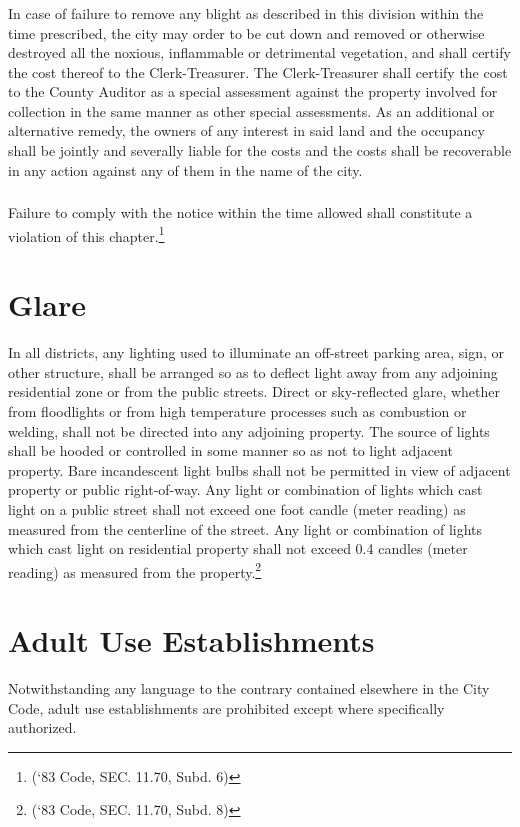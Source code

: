 \subsubsection{}
In case of failure to remove any blight as described in this division within the time prescribed, the city may order to be cut down and removed or otherwise destroyed all the noxious, inflammable or detrimental vegetation, and shall certify the cost thereof to the Clerk-Treasurer. The Clerk-Treasurer shall certify the cost to the County Auditor as a special assessment against the property involved for collection in the same manner as other special assessments. As an additional or alternative remedy, the owners of any interest in said land and the occupancy shall be jointly and severally liable for the costs and the costs shall be recoverable in any action against any of them in the name of the city.
\subsubsection{}
Failure to comply with the notice within the time allowed shall constitute a violation of this chapter.\footnote{(‘83 Code, SEC. 11.70, Subd. 6)}

\section{Glare}
In all districts, any lighting used to illuminate an off-street parking area, sign, or other structure, shall be arranged so as to deflect light away from any adjoining residential zone or from the public streets. Direct or sky-reflected glare, whether from floodlights or from high temperature processes such as combustion or welding, shall not be directed into any adjoining property. The source of lights shall be hooded or controlled in some manner so as not to light adjacent property. Bare incandescent light bulbs shall not be permitted in view of adjacent property or public right-of-way.  Any light or combination of lights which cast light on a public street shall not exceed one foot candle (meter reading) as measured from the centerline of the street. Any light or combination of lights which cast light on residential property shall not exceed 0.4 candles (meter reading) as measured from the property.\footnote{(‘83 Code, SEC. 11.70, Subd. 8)}

\section{Adult Use Establishments}
Notwithstanding any language to the contrary contained elsewhere in the City Code, adult use establishments are prohibited except where specifically authorized.

